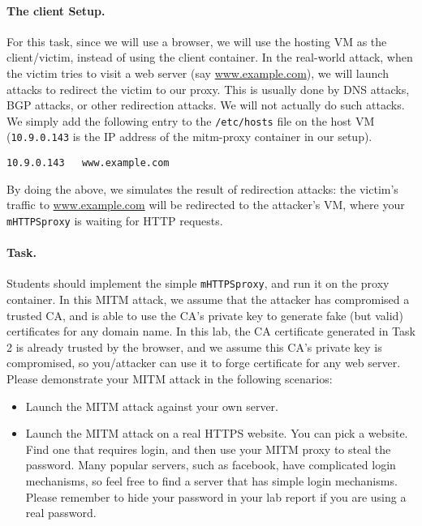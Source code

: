 \paragraph{The client Setup.} 
For this task, since we will use a browser, we will 
use the hosting VM as the client/victim, instead of using 
the client container. 
In the real-world attack, when the victim tries to visit
a web server (say \url{www.example.com}), we will launch attacks to redirect
the victim to our proxy. This is usually done by DNS attacks, BGP attacks, or other 
redirection attacks. We will not actually do such attacks. We simply 
add the following entry to the \texttt{/etc/hosts} file on the host VM (\texttt{10.9.0.143} 
is the IP address of the mitm-proxy container in our setup). 

\begin{lstlisting}
10.9.0.143   www.example.com
\end{lstlisting}

By doing the above, we simulates the result of redirection attacks:
the victim's traffic to \url{www.example.com} 
will be redirected to the attacker's VM, where your \texttt{mHTTPSproxy} 
is waiting for HTTP requests. 
 

\paragraph{Task.} Students should implement the simple \texttt{mHTTPSproxy},
and run it on the proxy container. 
In this MITM attack, we assume that the attacker has compromised a trusted CA, and is 
able to use the CA's private key to generate fake (but valid) certificates for any
domain name. In this lab, the CA certificate generated in Task 2
is already trusted by the browser, and we assume this CA's private key
is compromised, so you/attacker can use it to forge certificate for any web server. 
Please demonstrate your MITM attack in the following scenarios:


\begin{itemize}

\item Launch the MITM attack against your own server. 

\item Launch the MITM attack on a real HTTPS website. You can pick 
a website. Find one that requires login, and then use your MITM proxy to 
steal the password. Many popular servers, such as facebook, have complicated 
login mechanisms, so feel free to find a server that has simple login mechanisms. 
Please remember to hide your password in your lab report if you 
are using a real password. 
\end{itemize}



